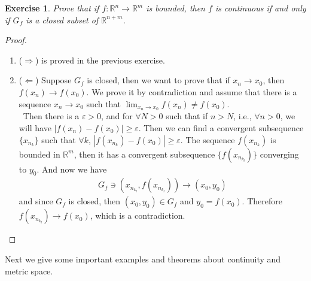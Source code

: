 \documentclass[12pt,leqno]{amsart}
\newtheorem{exercise}{Exercise}[section]
\theoremstyle{definition}
\numberwithin{equation}{subsection}
\begin{document}
\medskip

\newpage
\begin{exercise}
Prove that if $f:\mathbb{R}^n\to \mathbb{R}^m$ is bounded, then $f$ is continuous if and only if $G_f$ is a closed subset of $\mathbb{R}^{n+m}$.
\end{exercise}
\begin{proof}
~\begin{enumerate}
    \item ($\Rightarrow$) is proved in the previous exercise.
    \item ($\Leftarrow$) Suppose $G_f$ is closed, then we want to prove that if $x_n\to x_0$, then $f(x_n)\to f(x_0)$. We prove it by contradiction and assume that there is a sequence $x_n\to x_0$ such that $\lim_{x_n\to x_0}f(x_n)\neq f(x_0)$. \\
    \hspace*{1em}\, Then there is a $\varepsilon > 0$, and for $\forall N > 0$ such that if $n > N$, i.e., $\forall n > 0$, we will have $|f(x_n) - f(x_0)|\geq \varepsilon$. Then we can find a convergent subsequence $\{x_{n_k}\}$ such that $\forall k$, $|f(x_{n_k}) - f(x_0)|\geq \varepsilon$. The sequence $f(x_{n_k})$ is bounded in $\mathbb{R}^m$, then it has a convergent subsequence $\{f(x_{n_{k_l}})\}$ converging to $y_0$. And now we have 
    \begin{align*}
        G_f \ni \left(x_{n_{k_l}},f(x_{n_{k_l}})\right) \to (x_0,y_0)
    \end{align*}
    and since $G_f$ is closed, then $(x_0,y_0)\in G_f$ and $y_0 = f(x_0)$. Therefore $f(x_{n_{k_l}})\to f(x_0)$, which is a contradiction.
\end{enumerate}
\end{proof}

\medskip
 
Next we give some important examples and theorems about continuity and metric space.
\end{document}
